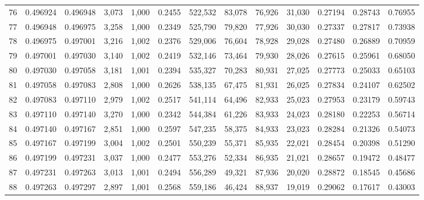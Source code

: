 \begin{tabular}{rrrrrrrrrrrrr}
76  &  0.496924 &  0.496948 &   3,073 &  1,000 &                                     0.2455 &  522,532 &   83,078 &   76,926 &   31,030 &  0.27194 &  0.28743 &  0.76955 \\
77  &  0.496948 &  0.496975 &   3,258 &  1,000 &                                     0.2349 &  525,790 &   79,820 &   77,926 &   30,030 &  0.27337 &  0.27817 &  0.73938 \\
78  &  0.496975 &  0.497001 &   3,216 &  1,002 &                                     0.2376 &  529,006 &   76,604 &   78,928 &   29,028 &  0.27480 &  0.26889 &  0.70959 \\
79  &  0.497001 &  0.497030 &   3,140 &  1,002 &                                     0.2419 &  532,146 &   73,464 &   79,930 &   28,026 &  0.27615 &  0.25961 &  0.68050 \\
80  &  0.497030 &  0.497058 &   3,181 &  1,001 &                                     0.2394 &  535,327 &   70,283 &   80,931 &   27,025 &  0.27773 &  0.25033 &  0.65103 \\
81  &  0.497058 &  0.497083 &   2,808 &  1,000 &                                     0.2626 &  538,135 &   67,475 &   81,931 &   26,025 &  0.27834 &  0.24107 &  0.62502 \\
82  &  0.497083 &  0.497110 &   2,979 &  1,002 &                                     0.2517 &  541,114 &   64,496 &   82,933 &   25,023 &  0.27953 &  0.23179 &  0.59743 \\
83  &  0.497110 &  0.497140 &   3,270 &  1,000 &                                     0.2342 &  544,384 &   61,226 &   83,933 &   24,023 &  0.28180 &  0.22253 &  0.56714 \\
84  &  0.497140 &  0.497167 &   2,851 &  1,000 &                                     0.2597 &  547,235 &   58,375 &   84,933 &   23,023 &  0.28284 &  0.21326 &  0.54073 \\
85  &  0.497167 &  0.497199 &   3,004 &  1,002 &                                     0.2501 &  550,239 &   55,371 &   85,935 &   22,021 &  0.28454 &  0.20398 &  0.51290 \\
86  &  0.497199 &  0.497231 &   3,037 &  1,000 &                                     0.2477 &  553,276 &   52,334 &   86,935 &   21,021 &  0.28657 &  0.19472 &  0.48477 \\
87  &  0.497231 &  0.497263 &   3,013 &  1,001 &                                     0.2494 &  556,289 &   49,321 &   87,936 &   20,020 &  0.28872 &  0.18545 &  0.45686 \\
88  &  0.497263 &  0.497297 &   2,897 &  1,001 &                                     0.2568 &  559,186 &   46,424 &   88,937 &   19,019 &  0.29062 &  0.17617 &  0.43003 \\

\end{tabular}
